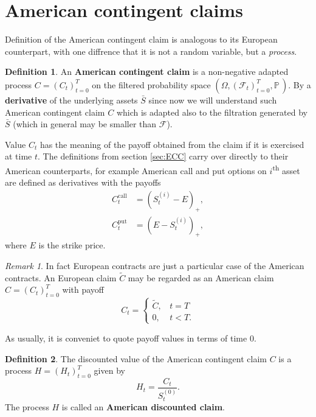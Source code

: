 \documentclass[a4paper,12pt, oneside]{book}
\theoremstyle{definition}
\newtheorem{mydef}{Definition}[chapter]
\theoremstyle{remark}
\newtheorem{remark}{Remark}[chapter]
\def\P{{\mathbb{P}}\,}
\def\Sa{\bar{S}}
\begin{document}
\section{American contingent claims}
Definition of the American contingent claim is analogous to its European counterpart, with one diffrence that it is not a random variable, but a \emph{process}.
\begin{mydef}
 \label{def:cc_am}
 An \textbf{American contingent claim} is a non-negative adapted process $C = (C_t)_{t=0}^T$ on the filtered probability space $(\Omega, (\mathcal{F}_t)_{t=0}^T, \P)$.
By a \textbf{derivative} of the underlying assets $\Sa$ since now we will understand such American contingent claim $C$ which is adapted also to the filtration generated by $\Sa$ (which in general may be smaller than $\mathcal{F}$).
\end{mydef}
Value $C_t$ has the meaning of the payoff obtained from the claim if it is exercised at time $t$. The definitions from section \ref{sec:ECC} carry over directly to their American counterparts, for example American call and put options on $i$\textsuperscript{th} asset are defined as derivatives with the payoffs
\begin{equation*}
 \begin{split}
  C^{\text{call}}_t &= (S^{(i)}_t - E)_+, \\
  C^{\text{put}}_t &= (E - S^{(i)}_t)_+,
 \end{split}
\end{equation*}
where $E$ is the strike price.
\begin{remark}
 In fact European contracts are just a particular case of the American contracts. An European claim $\tilde{C}$ may be regarded as an American claim $C = (C_t)_{t=0}^T$ with payoff
 \[ C_t = \begin{cases}
         \tilde{C},\ \ \ \ t = T \\
         0,\ \ \ \ \ t < T.
        \end{cases}
        \]
\end{remark}

As usually, it is conveniet to quote payoff values in terms of time 0.
\begin{mydef}
 The discounted value of the American contingent claim $C$ is a process $H = (H_t)_{t=0}^T$ given by
 \begin{equation*}
  H_t = \frac{C_t}{S^{(0)}_t}.
 \end{equation*}
 The process $H$ is called an \textbf{American discounted claim}.
\end{mydef}
\end{document}
